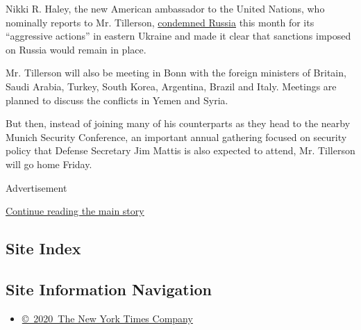 Nikki R. Haley, the new American ambassador to the United Nations, who
nominally reports to Mr. Tillerson,
\href{https://www.nytimes.com/2017/02/02/world/europe/nikki-haley-trump-ukraine-russia-putin.html}{condemned
Russia} this month for its ``aggressive actions'' in eastern Ukraine and
made it clear that sanctions imposed on Russia would remain in place.

Mr. Tillerson will also be meeting in Bonn with the foreign ministers of
Britain, Saudi Arabia, Turkey, South Korea, Argentina, Brazil and Italy.
Meetings are planned to discuss the conflicts in Yemen and Syria.

But then, instead of joining many of his counterparts as they head to
the nearby Munich Security Conference, an important annual gathering
focused on security policy that Defense Secretary Jim Mattis is also
expected to attend, Mr. Tillerson will go home Friday.

Advertisement

\protect\hyperlink{after-bottom}{Continue reading the main story}

\hypertarget{site-index}{%
\subsection{Site Index}\label{site-index}}

\hypertarget{site-information-navigation}{%
\subsection{Site Information
Navigation}\label{site-information-navigation}}

\begin{itemize}
\tightlist
\item
  \href{https://help.nytimes.com/hc/en-us/articles/115014792127-Copyright-notice}{©~2020~The
  New York Times Company}
\end{itemize}

